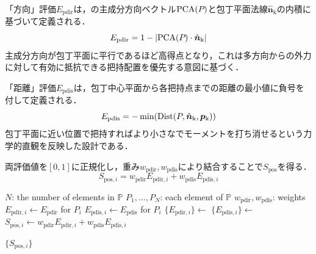 「方向」評価$E_{\mathrm{pdir}}$は，{\nameholdingpointset}の主成分方向ベクトル$\mathrm{PCA}(\equholdingpointset)$と包丁平面法線$\hat{\bm{n}}_{\mathrm{k}}$の内積に基づいて定義される．
\begin{equation}
E_{\mathrm{pdir}} = 1 - |\mathrm{PCA}(\equholdingpointset) \cdot \hat{\bm{n}}_{\mathrm{k}}|
\end{equation}
主成分方向が包丁平面に平行であるほど高得点となり，これは多方向からの外力に対して有効に抵抗できる把持配置を優先する意図に基づく．

「距離」評価$E_{\mathrm{pdis}}$は，包丁中心平面から各把持点までの距離の最小値に負号を付して定義される．
\begin{equation}
E_{\mathrm{pdis}} = -\min(\mathrm{Dist}(\equholdingpointset, \hat{\bm{n}}_{\mathrm{k}}, \bm{p}_{\mathrm{k}}))
\end{equation}
包丁平面に近い位置で把持すればより小さな{\namefingerforce}でモーメントを打ち消せるという力学的直観を反映した設計である．

両評価値を$[0,1]$に正規化し，重み$w_{\mathrm{pdir}}, w_{\mathrm{pdis}}$により結合することで$S_{\mathrm{pos}}$を得る．
\begin{equation}
    S_{\mathrm{pos,}i} = w_{\mathrm{pdir}} E_{\mathrm{pdir,}i} + w_{\mathrm{pdis}} E_{\mathrm{pdis,}i}
    \label{equ:holding_score_pos_final}
\end{equation}

\begin{algorithm}[!t]
\caption{Calculate the positional score}
\label{algo:holding_score_pos}
\begin{algorithmic}[1]
\setlength{\baselineskip}{11pt}
    \State $N$: the number of elements in $\mathbb{P}$
    \State $P_1,\ldots,P_N$: each element of $\mathbb{P}$
    \State $w_\mathrm{pdir}, w_\mathrm{pdis}$: weights
        \State $E_{\mathrm{pdir,}i}\gets E_\mathrm{pdir}$ for $P_i$
        \State $E_{\mathrm{pdis,}i}\gets E_\mathrm{pdis}$ for $P_i$ \label{algoline:holding_CalDynamicScore-pos-score}
    \EndFor
    \State $\{E_{\mathrm{pdir,}i}\}\gets$  \label{algoline:holding_score-pos-final-st}
    \State $\{E_{\mathrm{pdis,}i}\}\gets$ 
        \State $S_{\mathrm{pos},i} \gets w_\mathrm{pdir} E_{\mathrm{pdir},i} + w_\mathrm{pdis} E_{\mathrm{pdis},i}$
    \EndFor  \label{algoline:holding_score-pos-final-ed}

    \State \Return $\{S_{\mathrm{pos},i}\}$
\EndFunction
\end{algorithmic}
\end{algorithm}



